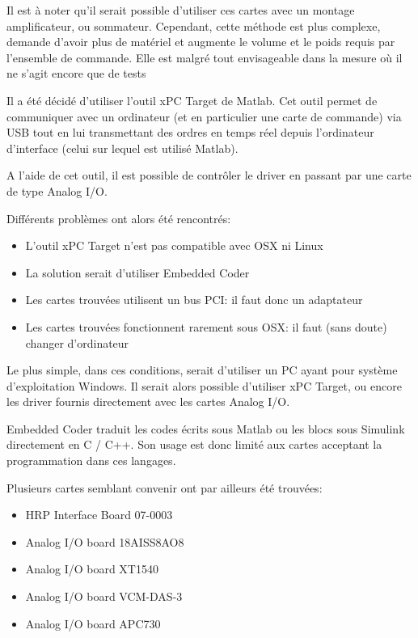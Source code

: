 \documentclass[11pt]{report}
\begin{document}
Il est à noter qu'il serait possible d'utiliser ces cartes avec un montage 
amplificateur, ou sommateur. Cependant, cette méthode est plus complexe, demande 
d'avoir plus de matériel et augmente le volume et le poids requis par l'ensemble 
de commande. Elle est malgré tout envisageable dans la mesure où il ne s'agit 
encore que de tests

Il a été décidé d'utiliser l'outil xPC Target de Matlab. Cet outil permet 
de communiquer avec un ordinateur (et en particulier une carte de commande) via 
USB tout en lui transmettant des ordres en temps réel depuis l'ordinateur 
d'interface (celui sur lequel est utilisé Matlab). 

A l'aide de cet outil, il est possible de contrôler le driver en passant par une 
carte de type Analog I/O. 

Différents problèmes ont alors été rencontrés:

\begin{itemize}
  
  \item{L'outil xPC Target n'est pas compatible avec OSX ni Linux}
  
  \item{La solution serait d'utiliser Embedded Coder}
  
  \item{Les cartes trouvées utilisent un bus PCI: il faut donc un adaptateur}
  
  \item{Les cartes trouvées fonctionnent rarement sous OSX: il faut (sans doute) changer d'ordinateur}
  
\end{itemize}

Le plus simple, dans ces conditions, serait d'utiliser un PC ayant pour système 
d'exploitation Windows. Il serait alors possible d'utiliser xPC Target, ou 
encore les driver fournis directement avec les cartes Analog I/O. 

Embedded Coder traduit les codes écrits sous Matlab ou les blocs sous Simulink 
directement en C / C++. Son usage est donc limité aux cartes acceptant la 
programmation dans ces langages.

Plusieurs cartes semblant convenir ont par ailleurs été trouvées:

\begin{itemize}
  
  \item{HRP Interface Board 07-0003}
  
  \item{Analog I/O board 18AISS8AO8}
  
  \item{Analog I/O board XT1540}
  
  \item{Analog I/O board VCM-DAS-3}
  
  \item{Analog I/O board APC730}
  
  \end{itemize}
\end{document}
